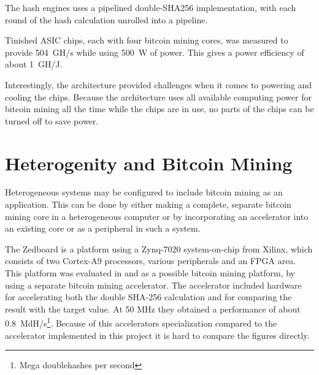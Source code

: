 The hash engines uses a pipelined double-SHA256 implementation, with each round of the hash calculation
unrolled into a pipeline.

Tinished ASIC chips, each with four bitcoin mining cores, was measured to provide 504~GH/s while using
500~W of power. This gives a power efficiency of about 1~GH/J.

Interestingly, the architecture provided challenges when it comes to powering and cooling the chips.
Because the architecture uses all available computing power for bitcoin mining all the time while
the chips are in use, no parts of the chips can be turned off to save power. \cite{goldstrike}


\section{Heterogenity and Bitcoin Mining}

Heterogeneous systems may be configured to include bitcoin mining as an application. This can be
done by either making a complete, separate bitcoin mining core in a heterogeneous computer
or by incorporating an accelerator into an existing core or as a peripheral in such a system.

The Zedboard is a platform using a Zynq-7020 system-on-chip from Xilinx, which consists of
two Cortex-A9 processors, various peripherals and an FPGA area. This platform was evaluated in \cite{xcell-bitcoin}
and \cite{standridge-master} as a possible bitcoin mining platform, by using a separate bitcoin mining
accelerator. The accelerator included hardware for accelerating both the double SHA-256 calculation
and for comparing the result with the target value. At 50 MHz they obtained a performance of about
0.8~MdH/s\footnote{Mega doublehashes per second}. Because of this accelerators specialization compared
to the accelerator implemented in this project it is hard to compare the figures directly. \cite{xcell-bitcoin}

